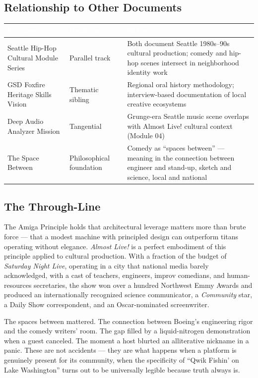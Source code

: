 \documentclass[11pt,letterpaper]{article}
\newcommand{\tableheader}[1]{\textbf{\sffamily\textcolor{white}{#1}}}
\begin{document}
\subsection{Relationship to Other Documents}

\begin{center}
\begin{tabularx}{\textwidth}{L{4cm}L{3cm}X}
\toprule
{}
\tableheader{Document} & \tableheader{Relationship} & \tableheader{Notes} \\
\midrule
Seattle Hip-Hop Cultural Module Series & Parallel track & Both document Seattle 1980s--90s cultural production; comedy and hip-hop scenes intersect in neighborhood identity work \\
GSD Foxfire Heritage Skills Vision & Thematic sibling & Regional oral history methodology; interview-based documentation of local creative ecosystems \\
Deep Audio Analyzer Mission & Tangential & Grunge-era Seattle music scene overlaps with Almost Live! cultural context (Module 04) \\
The Space Between & Philosophical foundation & Comedy as ``spaces between'' --- meaning in the connection between engineer and stand-up, sketch and science, local and national \\
\bottomrule
\end{tabularx}
\end{center}

\subsection{The Through-Line}

The Amiga Principle holds that architectural leverage matters more than brute force --- that a modest machine with principled design can outperform titans operating without elegance. \textit{Almost Live!} is a perfect embodiment of this principle applied to cultural production. With a fraction of the budget of \textit{Saturday Night Live}, operating in a city that national media barely acknowledged, with a cast of teachers, engineers, improv comedians, and human-resources secretaries, the show won over a hundred Northwest Emmy Awards and produced an internationally recognized science communicator, a \textit{Community} star, a Daily Show correspondent, and an Oscar-nominated screenwriter.

The spaces between mattered. The connection between Boeing's engineering rigor and the comedy writers' room. The gap filled by a liquid-nitrogen demonstration when a guest canceled. The moment a host blurted an alliterative nickname in a panic. These are not accidents --- they are what happens when a platform is genuinely present for its community, when the specificity of ``Qwik Fishin' on Lake Washington'' turns out to be universally legible because truth always is.
\end{document}
